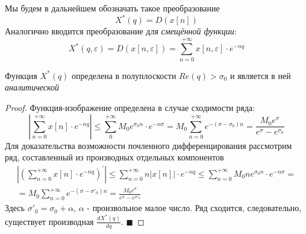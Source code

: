 \documentclass[12pt,twoside]{report}
\theoremstyle{MyNonumberplain}
\begin{document}
        Мы будем в дальнейшем обозначать такое преобразование
        \begin{equation*}
            X^*(q) = D(x[n])
        \end{equation*}
        Аналогично вводится преобразование для \textit{смещённой функции}:
        \begin{equation*}
            X^*(q,\varepsilon) = D(x[n,\varepsilon])=\sum_{n=0}^{+\infty} x[n,\varepsilon] \cdot e^{-nq}
        \end{equation*}
    
        \begin{theorem}
            Функция $X^*(q)$ определена в полуплоскости $Re(q)>\sigma_0$ и является в ней \textit{аналитической}
        \end{theorem}
        \begin{proof}
            Функция-изображение определена в случае сходимости ряда:            
            \begin{equation*}
                \left| \sum_{n=0}^{+\infty} x[n] \cdot e^{-nq}\right| \leq \sum_0^{+\infty}M_0e^{\sigma_0 n} \cdot e^{-n\sigma} =
                M_0 \sum_{n=0}^{+\infty}e^{-(\sigma - \sigma_0)n}=\frac{M_0e^\sigma}{e^{\sigma}-e^{\sigma_0}}
            \end{equation*}
            Для доказательства возможности почленного дифференцирования рассмотрим ряд, составленный
            из производных отдельных компонентов
            \begin{eqnarray*}
                \left|\left(\sum_{n=0}^{+\infty} x[n] \cdot e^{-nq}\right)^{'}\right| 
                \leq \sum_{n=0}^{+\infty} n |x[n]| \cdot e^{-nq}
                \leq \sum_{n=0}^{+\infty}M_0ne^{\sigma_0 n} \cdot e^{-n\sigma} =\\
                =M_0 \sum_{n=0}^{+\infty}e^{-(\sigma - \sigma'_0)n}=\frac{M_0e^\sigma}{e^{\sigma}-e^{\sigma'_0}}                   
            \end{eqnarray*}
            Здесь $\sigma'_0 = \sigma_0+\alpha$, $\alpha$ - произвольное малое число. Ряд сходится, следовательно, существует
            производная $\frac{dX^*(q)}{dq}$. $\blacksquare$            
        \end{proof}
\end{document}
